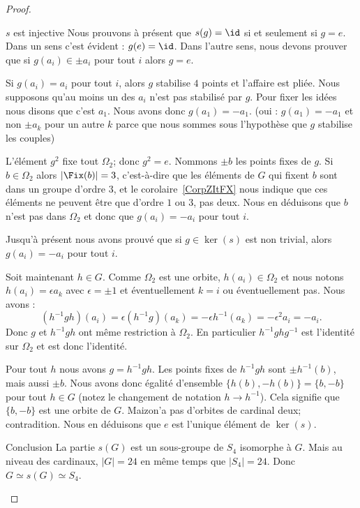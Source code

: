 \begin{proof}
\begin{subproof}
\begin{subproof}
			\item[\( s\) est injective]
			Nous prouvons à présent que \( s(g)=\id\) si et seulement si \( g=e\). Dans un sens c'est évident : \( g(e)=\id\). Dans l'autre sens, nous devons prouver que si \( g(a_i)\in \pm a_i\) pour tout \( i\) alors \( g=e\).

			Si \( g(a_i)=a_i\) pour tout \( i\), alors \( g\) stabilise \( 4\) points et l'affaire est pliée. Nous supposons qu'au moins un des \( a_i\) n'est pas stabilisé par \( g\). Pour fixer les idées nous disons que c'est \( a_1\). Nous avons donc \( g(a_1)=-a_1\). (oui : \( g(a_1)=-a_1\) et non \( \pm a_k\) pour un autre \( k\) parce que nous sommes sous l'hypothèse que \( g\) stabilise les couples)

			L'élément \( g^2\) fixe tout \( \Omega_2\); donc \( g^2=e\). Nommons \( \pm b\) les points fixes de \( g\). Si \( b\in \Omega_2\) alors \( | \Fix(b) |=3\), c'est-à-dire que les éléments de \( G\) qui fixent \( b\) sont dans un groupe d'ordre \( 3\), et le corolaire~\ref{CorpZItFX} nous indique que ces éléments ne peuvent être que d'ordre \( 1\) ou \( 3\), pas deux. Nous en déduisons que \( b\) n'est pas dans \( \Omega_2\) et donc que \( g(a_i)=-a_i\) pour tout \( i\).

			Jusqu'à présent nous avons prouvé que si \( g\in \ker(s)\) est non trivial,  alors \( g(a_i)=-a_i\) pour tout \( i\).

			Soit maintenant \( h\in G\). Comme \( \Omega_2\) est une orbite, \( h(a_i)\in \Omega_2\) et nous notons \( h(a_i)=\epsilon a_k\) avec \( \epsilon=\pm 1\) et éventuellement \( k=i\) ou éventuellement pas. Nous avons :
			\begin{equation}
				(h^{-1}gh)(a_i)=\epsilon (h^{-1} g)(a_k)=-\epsilon h^{-1}(a_k)=-\epsilon^2 a_i=-a_i.
			\end{equation}
			Donc \( g\) et \( h^{-1} g h\) ont même restriction à \( \Omega_2\). En particulier \( h^{-1} ghg^{-1}\) est l'identité sur \( \Omega_2\) et est donc l'identité.

			Pour tout \( h\) nous avons \( g=h^{-1} gh\). Les points fixes de \( h^{-1}g h\) sont \( \pm h^{-1}(b)\), mais aussi \( \pm b\). Nous avons donc égalité d'ensemble \( \{ h(b),-h(b) \}=\{ b,-b \}\) pour tout \( h\in G\) (notez le changement de notation \( h\to h^{-1}\)). Cela signifie que \( \{ b,-b \}\) est une orbite de \( G\). Maizon'a pas d'orbites de cardinal deux; contradition. Nous en déduisons que \( e\) est l'unique élément de \( \ker(s)\).

			\item[Conclusion]
			La partie \( s(G)\) est un sous-groupe de \( S_4\) isomorphe à \( G\). Mais au niveau des cardinaux, \( | G |=24\) en même temps que \( | S_4 |=24\). Donc \( G\simeq s(G)\simeq S_4\).
		\end{subproof}
	\end{subproof}


\end{proof}
